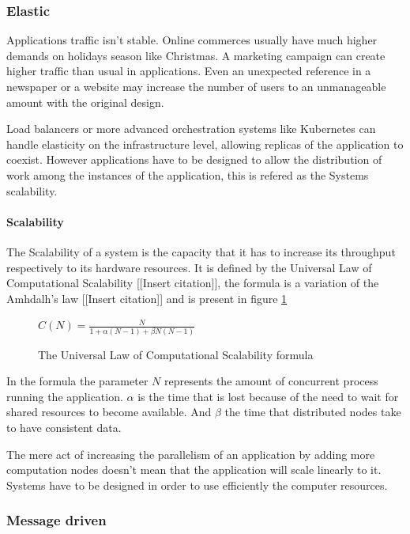 \documentclass[../main.tex]{subfiles}
\begin{document}
\subsubsection{Elastic}

Applications traffic isn't stable. Online commerces
usually have much higher demands on holidays season like Christmas. A marketing
campaign can create higher traffic than usual in applications. Even an
unexpected reference in a newspaper or a website may increase the number of
users to an unmanageable amount with the original design.

Load balancers or more advanced orchestration systems like Kubernetes
\cite{Production-GradeKubernetes} can handle elasticity on the infrastructure
level, allowing replicas of the application to coexist. However applications
have to be designed to allow the distribution of work among the instances of the
application, this is refered as the Systems scalability.

\paragraph{Scalability}

The Scalability of a system is the capacity that it has to increase its
throughput respectively to its hardware resources. It is defined by the
Universal Law of Computational Scalability [[Insert citation]], the formula
is a variation of the Amhdalh's law [[Insert citation]] and is present in figure \ref{fig:scalability}

\begin{figure}[ht] \centering
  $C(N)={\frac {N}{1+\alpha (N-1)+\beta N(N-1)}}$
  \caption{The Universal Law of Computational Scalability formula}
  \label{fig:scalability}
\end{figure}

In the formula the parameter $N$ represents the amount of concurrent process
running the application. $\alpha$ is the time that is lost because of the need
to wait for shared resources to become available. And $\beta$ the time that
distributed nodes take to have consistent data.

The mere act of increasing the parallelism of an application by adding more
computation nodes doesn't mean that the application will scale linearly to it.
Systems have to be designed in order to use efficiently the computer resources.

\subsubsection{Message driven}
\end{document}
